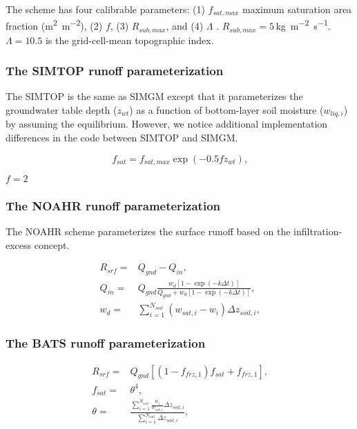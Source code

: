 \documentclass[essd]{copernicus}
\begin{document}
The scheme has four calibrable parameters: (1) $f_{sat,max}$ maximum saturation
area fraction (\unit{m^2~m^{-2}}), (2) $f$, (3) $R_{sub,max}$, and (4) $\Lambda$ .
$R_{sub,max} = 5$\,\unit{kg~m^{-2}~s^{-1}}. $\Lambda = 10.5$ is the
grid-cell-mean topographic index.

\subsubsection{The SIMTOP runoff parameterization}

The SIMTOP is the same as SIMGM except that it parameterizes the groundwater
table depth ($z_{wt}$) as a function of bottom-layer soil moisture ($w_{liq,i}$)
by assuming the equilibrium. However, we notice additional implementation
differences in the code between SIMTOP and SIMGM.

\begin{equation}
    f_{sat} = f_{sat,max} \exp(-0.5 f z_{wt}) \text{,}
\end{equation}

$f=2$


\subsubsection{The NOAHR runoff parameterization}

The NOAHR scheme parameterizes the surface runoff based on the
infiltration-excess concept.

\begin{align}
    R_{srf} = & Q_{gnd} - Q_{in} \text{,}                                                              \\
    Q_{in} =  & Q_{gnd} \frac{w_d [1-\exp(-k\Delta t)]}{Q_{gnd} + w_d [1 - \exp(-k\Delta t)]} \text{,} \\
    w_d =     & \sum_{i=1}^{N_{soil}} (w_{sat,i} - w_i) \Delta z_{soil,i} \text{,}
\end{align}


\subsubsection{The BATS runoff parameterization}
\begin{align}
    R_{srf} = & Q_{gnd} \left[ (1 - f_{frz,1}) f_{sat} + f_{frz,1} \right] \text{,}                                                 \\
    f_{sat} = & \theta^4 \text{,}                                                                                                   \\
    \theta =  & \frac{\sum_{i=1}^{N_{soil}}\frac{w_i}{w_{sat,i}}\Delta z_{soil,i}}{\sum_{i=1}^{N_{soil}}\Delta z_{soil,i}} \text{,}
\end{align}
\end{document}
